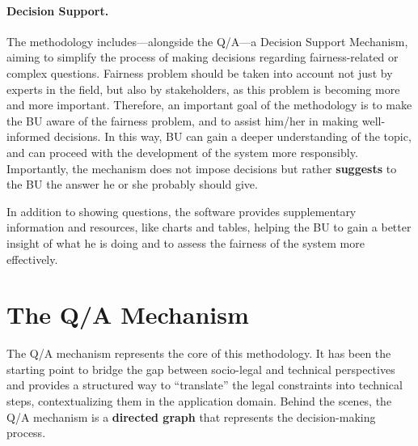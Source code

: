 \documentclass[12pt,a4paper,openright,twoside]{book}
\begin{document}
\paragraph{Decision Support.}
The methodology includes---alongside the \ac{Q/A}---a Decision Support Mechanism, aiming to simplify the process of making decisions regarding fairness-related or complex questions.
%
Fairness problem should be taken into account not just by experts in the field, but also by stakeholders, as this problem is becoming more and more important.
%
Therefore, an important goal of the methodology is to make the \ac{BU} aware of the fairness problem, and to assist him/her in making well-informed decisions.
%
In this way, \ac{BU} can gain a deeper understanding of the topic, and can proceed with the development of the system more responsibly.
%
Importantly, the mechanism does not impose decisions but rather \textbf{suggests} to the \ac{BU} the answer he or she probably should give.

In addition to showing questions, the software provides supplementary information and resources, like charts and tables, helping the \ac{BU} to gain a better insight of what he is doing and to assess the fairness of the system more effectively.


\section{The \acs{Q/A} Mechanism}\label{sec:qa-mechanism}

The \acf{Q/A} mechanism represents the core of this methodology.
%
It has been the starting point to bridge the gap between socio-legal and technical perspectives and provides a structured way to ``translate'' the legal constraints into technical steps, contextualizing them in the application domain.
%
Behind the scenes, the \ac{Q/A} mechanism is a \textbf{directed graph} that represents the decision-making process.

\end{document}
